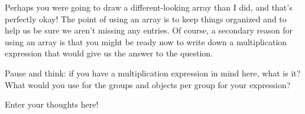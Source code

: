 \documentclass{ximera}
\begin{document}
Perhaps you were going to draw a different-looking array than I did, and that's perfectly okay! The point of using an array is to keep things organized and to help us be sure we aren't missing any entries. Of course, a secondary reason for using an array is that you might be ready now to write down a multiplication expression that would give us the answer to the question.
\begin{question}
Pause and think: if you have a multiplication expression in mind here, what is it? What would you use for the groups and objects per group for your expression?
\begin{freeResponse}
Enter your thoughts here!
\end{freeResponse}
\end{question}
\end{document}
